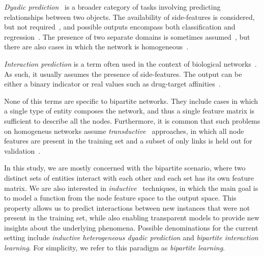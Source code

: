 %
%
\emph{Dyadic prediction}~\cite{menon2010loglinear,pahikkala2014twostep,jin2017multitask} is a broader category of tasks involving predicting relationships between two objects. The availability of side-features is considered, but not required~\cite{menon2010loglinear}, and possible outputs encompass both classification and regression~\cite{menon2010loglinear}. The presence of two separate domains is sometimes assumed~\cite{menon2010loglinear,pahikkala2014twostep}, but there are also cases in which the network is homogeneous~\cite{jin2017multitask}. 

%
\emph{Interaction prediction} is a term often used in the context of biological networks~\cite{schrynemackers2015classifying,pliakos2019network,chen2018machine,bagherian2020machine}. As such, it usually assumes the presence of side-features.
%
The output can be either a binary indicator or real values such as drug-target affinities~\cite{pahikkala2015more}.

None of this terms are specific to bipartite networks. They include cases in which a single type of entity composes the network, and thus a single feature matrix is sufficient to describe all the nodes.
Furthermore, it is common that such problems on homogeneus networks assume \emph{transductive}~\cite{chapelle2006semisupervised} approaches, in which all node features are present in the training set and a subset of only links is held out for validation~\cite{lu2011link,zhou2021progresses}.

In this study, we are mostly concerned with the bipartite scenario, where two distinct sets of entities interact with each other and each set has its own feature matrix. We are also interested in \emph{inductive}~\cite{chapelle2006semisupervised} techniques, in which the main goal is to model a function from the node feature space to the output space. This property allows us to predict interactions between new instances that were not present in the training set, while also enabling transparent models to provide new insights about the underlying phenomena.
%
Possible denominations for the current setting include \emph{inductive heterogeneous dyadic prediction} and \emph{bipartite interaction learning}. For simplicity, we refer to this paradigm as \emph{bipartite learning}.

